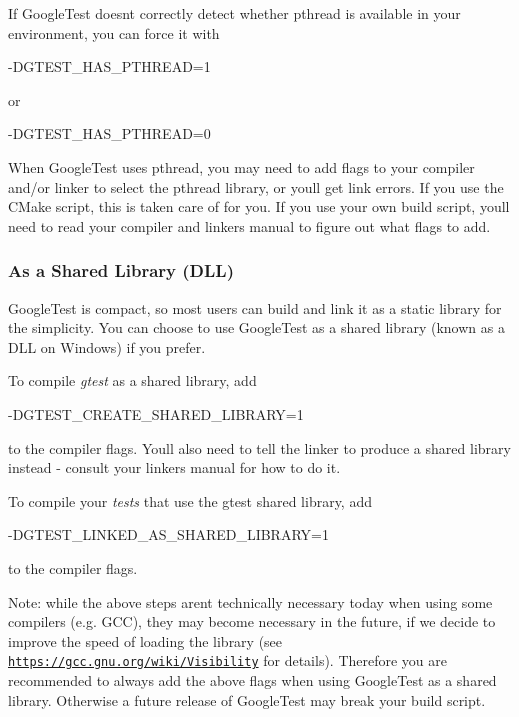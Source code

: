 If Google\+Test doesn\textquotesingle{}t correctly detect whether pthread is available in your environment, you can force it with


\begin{DoxyCode}
-DGTEST\_HAS\_PTHREAD=1
\end{DoxyCode}


or


\begin{DoxyCode}
-DGTEST\_HAS\_PTHREAD=0
\end{DoxyCode}


When Google\+Test uses pthread, you may need to add flags to your compiler and/or linker to select the pthread library, or you\textquotesingle{}ll get link errors. If you use the C\+Make script, this is taken care of for you. If you use your own build script, you\textquotesingle{}ll need to read your compiler and linker\textquotesingle{}s manual to figure out what flags to add.

\subsubsection*{As a Shared Library (D\+LL)}

Google\+Test is compact, so most users can build and link it as a static library for the simplicity. You can choose to use Google\+Test as a shared library (known as a D\+LL on Windows) if you prefer.

To compile {\itshape gtest} as a shared library, add


\begin{DoxyCode}
-DGTEST\_CREATE\_SHARED\_LIBRARY=1
\end{DoxyCode}


to the compiler flags. You\textquotesingle{}ll also need to tell the linker to produce a shared library instead -\/ consult your linker\textquotesingle{}s manual for how to do it.

To compile your {\itshape tests} that use the gtest shared library, add


\begin{DoxyCode}
-DGTEST\_LINKED\_AS\_SHARED\_LIBRARY=1
\end{DoxyCode}


to the compiler flags.

Note\+: while the above steps aren\textquotesingle{}t technically necessary today when using some compilers (e.\+g. G\+CC), they may become necessary in the future, if we decide to improve the speed of loading the library (see \href{https://gcc.gnu.org/wiki/Visibility}{\tt https\+://gcc.\+gnu.\+org/wiki/\+Visibility} for details). Therefore you are recommended to always add the above flags when using Google\+Test as a shared library. Otherwise a future release of Google\+Test may break your build script.

